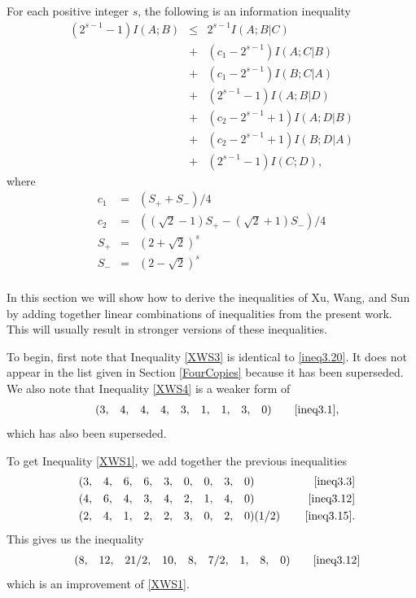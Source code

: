 \documentclass[10pt,journal]{IEEEtran}
\begin{document}
\begin{theorem}\label{thXWS2}
For each positive integer $s$, the following is an information inequality
\begin{eqnarray*}
(2^{s-1}-1)I(A;B) &\leq& 2^{s-1}I(A;B|C) \\
      &+& (c_1-2^{s-1})I(A;C|B)\\
      &+& (c_1-2^{s-1})I(B;C|A) \\
      &+&  (2^{s-1}-1)I(A;B|D) \\
      &+& (c_2-2^{s-1}+1)I(A;D|B)\\
      &+& (c_2-2^{s-1}+1)I(B;D|A)\\
      &+& (2^{s-1}-1)I(C;D),
\end{eqnarray*} where
\begin{eqnarray*}
c_1 &=& (S_++S_-)/4\\
c_2 &=& ((\sqrt2-1)S_+ - (\sqrt2+1)S_-)/4\\
S_+ &=& (2+\sqrt{2})^s\\
S_- &=& (2-\sqrt{2})^s\\
\end{eqnarray*}
\end{theorem}

In this section we will show how to derive the inequalities of Xu, Wang, and Sun by
adding together linear combinations of inequalities from the present work.  This will usually
result in stronger versions of these inequalities.

To begin, first note that Inequality \eqref{XWS3} is identical to \eqref{ineq3.20}.
It does not appear in the list given in Section \ref{FourCopies} because it has been
superseded.
We also note that Inequality \eqref{XWS4} is a weaker form of
\begin{align*}
&&(3&,&4&,&4&,&4&,&3&,&1&,&1&,&3&,&0)&&&& \eqref{ineq3.1},
\end{align*}
which has also been superseded.

To get Inequality \eqref{XWS1}, we add together the previous inequalities
\begin{align*}
&&(3&,&4&,&6&,&6&,&3&,&0&,&0&,&3&,&0)&&&& \eqref{ineq3.3}\\
&&(4&,&6&,&4&,&3&,&4&,&2&,&1&,&4&,&0)&&&& \eqref{ineq3.12}\\
&&(2&,&4&,&1&,&2&,&2&,&3&,&0&,&2&,&0)&(1/2)\hspace{2pt}&&& \eqref{ineq3.15}.
\end{align*}
This gives us the inequality
\begin{align*}
&&(8&,&12&,&21/2&,&10&,&8&,&7/2&,&1&,&8&,&0)&&&& \eqref{ineq3.12}
\end{align*}
which is an improvement of \eqref{XWS1}.
\end{document}
